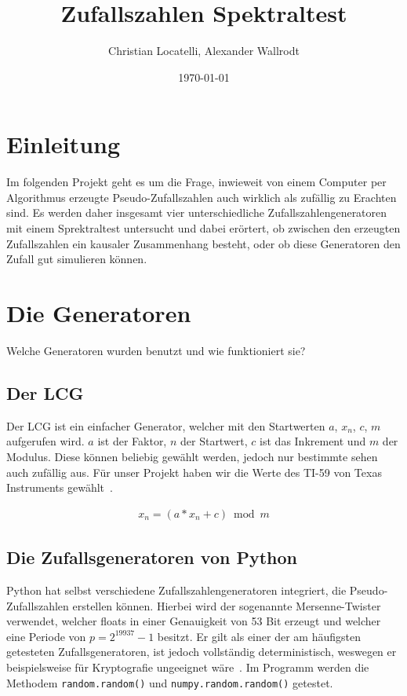 \documentclass[12pt]{article}
\title{\textbf{Zufallszahlen Spektraltest}}
\author{Christian Locatelli, Alexander Wallrodt}
\date{\today}
\begin{document}
    \maketitle
    \clearpage

    \tableofcontents
    \listoftables
    \listoffigures

    \clearpage


    \section{Einleitung}\label{sec:Einleitung}
    Im folgenden Projekt geht es um die Frage, inwieweit von einem Computer per Algorithmus erzeugte Pseudo-Zufallszahlen
    auch wirklich als zufällig zu Erachten sind.
    Es werden daher insgesamt vier unterschiedliche Zufallszahlengeneratoren mit einem Sprektraltest untersucht und dabei erörtert,
    ob zwischen den erzeugten Zufallszahlen ein kausaler Zusammenhang besteht,
    oder ob diese Generatoren den Zufall gut simulieren können.

    \section{Die Generatoren}\label{sec:die-generatoren}
    Welche Generatoren wurden benutzt und wie funktioniert sie?

    \subsection{Der LCG}\label{subsec:der-lcg}
    Der LCG ist ein einfacher Generator, welcher mit den Startwerten $a$, $x_n$, $c$, $m$ aufgerufen wird.
    $a$ ist der Faktor, $n$ der Startwert, $c$ ist das Inkrement und $m$ der Modulus.
    Diese können beliebig gewählt werden, jedoch nur bestimmte sehen auch zufällig aus.
    Für unser Projekt haben wir die Werte des TI-59 von Texas Instruments gewählt~\cite{lcg}.

    \begin{align*}
    x_n = (a * x_n + c) \bmod m
    \end{align*}

    \subsection{Die Zufallsgeneratoren von Python}\label{subsec:die-zufallsgeneratoren-von-python}
    Python hat selbst verschiedene Zufallszahlengeneratoren integriert, die Pseudo-Zufallszahlen erstellen können.
    Hierbei wird der sogenannte Mersenne-Twister verwendet, welcher floats in einer Genauigkeit von 53 Bit erzeugt und welcher
    eine Periode von $p=2^{19937}-1$ besitzt.
    Er gilt als einer der am häufigsten getesteten Zufallsgeneratoren, ist jedoch vollständig deterministisch,
    weswegen er beispielsweise für Kryptografie ungeeignet wäre~\cite{python-random,mersenne-twister}.
    Im Programm werden die Methodem \texttt{random.random()} und \texttt{numpy.random.random()} getestet.
\end{document}
